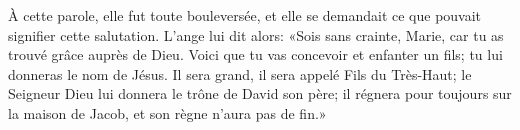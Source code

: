 À cette parole, elle fut toute bouleversée,
	et elle se demandait ce que pouvait signifier cette salutation.
L’ange lui dit alors: «Sois sans crainte, Marie,
	car tu as trouvé grâce auprès de Dieu.
Voici que tu vas concevoir et enfanter un fils;
	tu lui donneras le nom de Jésus.
Il sera grand, il sera appelé Fils du Très-Haut;
	le Seigneur Dieu lui donnera le trône de David son père;
	il régnera pour toujours sur la maison de Jacob, et son règne n’aura pas de fin.»
